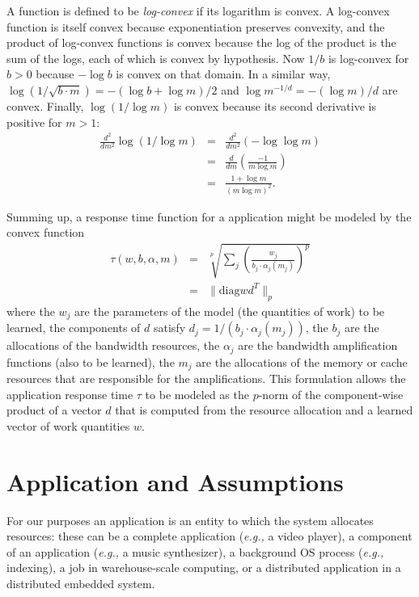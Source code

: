 A function is defined to be \emph{log-convex} if its logarithm is convex.
A log-convex function is itself convex because exponentiation preserves convexity,
and the product of log-convex functions is convex because the log of the product is the sum of the logs,
each of which is convex by hypothesis.
Now $1/b$ is log-convex for $b > 0$ because $-\log b$ is convex on that domain.
In a similar way, $\log(1/\sqrt{b\cdot m}) = -(\log b + \log m)/2$
and $\log m^{-1/d} = -(\log m)/d$ are convex.
Finally, $\log (1/\log m)$ is convex because its second derivative is positive for $m > 1$:
\begin{eqnarray*}
\frac{d^2}{dm^2}\log (1/\log m) &=& \frac{d^2}{dm^2}(-\log\log m)  \\
                                  &=& \frac{d}{dm}\left(\frac{-1}{m\log m}\right) \\
                                  &=& \frac{1 + \log m}{(m\log m)^2}.
\end{eqnarray*}

Summing up, a response time function for a application might be modeled by the convex function
\begin{eqnarray*}
\tau(w,b,\alpha,m) &=& \sqrt[p]{\sum_j \left(\frac{w_j}{b_j\cdot\alpha_j(m_j)}\right)^p}  \\
                   &=& \|\mbox{diag} wd^T \|_p
\end{eqnarray*}
where the $w_j$ are the parameters of the model (the quantities of work) to be learned,
the components of $d$ satisfy $d_j = 1/(b_j\cdot\alpha_j(m_j))$,
the $b_j$  are the allocations of the bandwidth resources,
the $\alpha_j$ are the bandwidth amplification functions (also to be learned),
the $m_j$ are the allocations of the memory or cache resources that are responsible for the amplifications.
This formulation allows the application response time $\tau$ to be modeled as the $p$-norm of
the component-wise product of a vector $d$ that is computed from the resource allocation
and a learned vector of work quantities $w$.



\section{Application and Assumptions}

For our purposes an application is an entity to which the system
allocates resources: these can be a complete application (\emph{e.g.,}
a video player), a component of an application (\emph{e.g.,} a music
synthesizer), a background OS process (\emph{e.g.,} indexing), a job
in warehouse-scale computing, or a distributed application in a
distributed embedded system.

